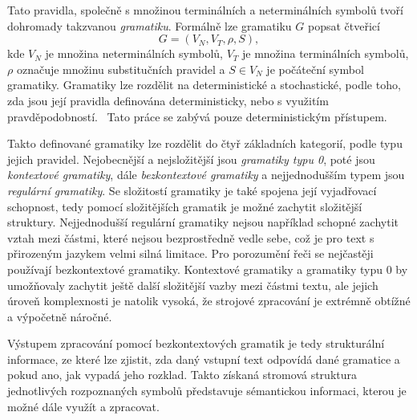 \begin{enumerate}
	      Tato pravidla, společně s množinou terminálních a neterminálních symbolů tvoří dohromady takzvanou \emph{gramatiku}.
	      Formálně lze gramatiku $G$ popsat čtveřicí
	      \[
		      G = (V_{N}, V_{T}, \rho, S),
	      \]
	      kde $V_{N}$ je množina neterminálních symbolů, $V_{T}$ je množina terminálních symbolů,
	      $\rho$ označuje množinu substitučních pravidel a $S \in V_{N}$ je počáteční symbol gramatiky.
	      Gramatiky lze rozdělit na deterministické a stochastické, podle toho, zda jsou její pravidla definována deterministicky,
	      nebo s využitím pravděpodobností.~\cite{PsutkaJ_2006_Mluvimes}
	      Tato práce se zabývá pouze deterministickým přístupem.

	      Takto definované gramatiky lze rozdělit do čtyř základních kategorií, podle typu jejich pravidel.
	      Nejobecnější a nejsložitější jsou \emph{gramatiky typu 0}, poté jsou \emph{kontextové gramatiky},
	      dále \emph{bezkontextové gramatiky} a nejjednodušším typem jsou \emph{regulární gramatiky}.
	      Se složitostí gramatiky je také spojena její vyjadřovací schopnost, tedy pomocí složitějších gramatik je možné
	      zachytit složitější struktury.
	      Nejjednodušší regulární gramatiky nejsou například schopné zachytit vztah mezi částmi, které nejsou bezprostředně vedle
	      sebe, což je pro text s přirozeným jazykem velmi silná limitace.
	      Pro porozumění řeči se nejčastěji používají bezkontextové gramatiky.
	      Kontextové gramatiky a gramatiky typu 0 by umožňovaly zachytit ještě další složitější vazby mezi částmi
	      textu, ale jejich úroveň komplexnosti je natolik vysoká,
	      že strojové zpracování je extrémně obtížné a výpočetně náročné.~\cite{PsutkaJ_2006_Mluvimes}

	      Výstupem zpracování pomocí bezkontextových gramatik je tedy strukturální informace, ze které lze zjistit,
	      zda daný vstupní text odpovídá dané gramatice a pokud ano, jak vypadá jeho rozklad.
	      Takto získaná stromová struktura jednotlivých rozpoznaných symbolů představuje sémantickou informaci,
	      kterou je možné dále využít a zpracovat.
\end{enumerate}
